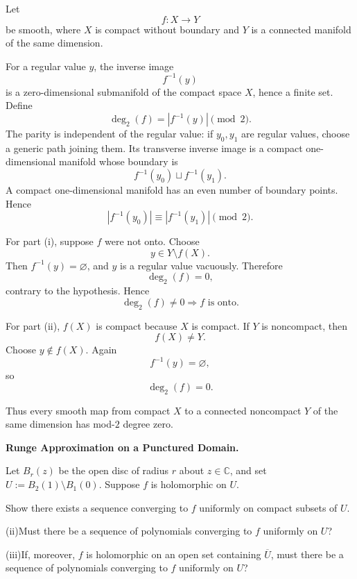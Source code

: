 \begin{solution}
Let
\[
f:X\to Y
\]
be smooth, where \(X\) is compact without boundary and \(Y\) is a connected manifold of the
same dimension.

For a regular value \(y\), the inverse image
\[
f^{-1}(y)
\]
is a zero-dimensional submanifold of the compact space \(X\), hence a finite set. Define
\[
\deg_2(f)
=
|f^{-1}(y)|\pmod2.
\]
The parity is independent of the regular value: if \(y_0,y_1\) are regular values, choose a
generic path joining them. Its transverse inverse image is a compact one-dimensional
manifold whose boundary is
\[
f^{-1}(y_0)\sqcup f^{-1}(y_1).
\]
A compact one-dimensional manifold has an even number of boundary points. Hence
\[
|f^{-1}(y_0)|
\equiv
|f^{-1}(y_1)|
\pmod2.
\]

For part (i), suppose \(f\) were not onto. Choose
\[
y\in Y\setminus f(X).
\]
Then \(f^{-1}(y)=\varnothing\), and \(y\) is a regular value vacuously. Therefore
\[
\deg_2(f)
=
0,
\]
contrary to the hypothesis. Hence
\[
\boxed{\deg_2(f)\neq0\Longrightarrow f\text{ is onto}.}
\]

For part (ii), \(f(X)\) is compact because \(X\) is compact. If \(Y\) is noncompact, then
\[
f(X)\neq Y.
\]
Choose \(y\notin f(X)\). Again
\[
f^{-1}(y)=\varnothing,
\]
so
\[
\boxed{\deg_2(f)=0.}
\]

Thus every smooth map from compact \(X\) to a connected noncompact \(Y\) of the same
dimension has mod-\(2\) degree zero.
\end{solution}


\begin{problem}[CP-II-0460]
\label{prob:cp-ii-0460}
\textbf{Runge Approximation on a Punctured Domain.}

	Let $B_r(z)$ be the open disc of radius $r$ about $z\in\mathbb C$, and set
	$U:=B_2(1)\setminus B_1(0)$. Suppose $f$ is holomorphic on $U$.

		 Show there exists a sequence converging to $f$ uniformly on compact subsets of $U$.
		\par\noindent (ii)\quad Must there be a sequence of polynomials converging to $f$ uniformly on $U$?
		\par\noindent (iii)\quad If, moreover, $f$ is holomorphic on an open set containing $\overline U$, must there be a sequence
		of polynomials converging to $f$ uniformly on $U$?
\end{problem}

